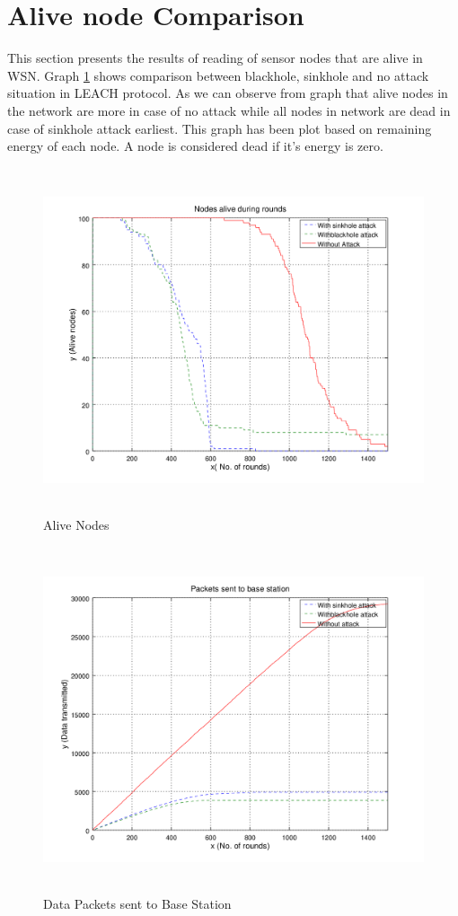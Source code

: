 \section{Alive node Comparison}
This section presents the results of reading of sensor nodes that are alive in WSN. Graph \ref{alive} shows comparison between blackhole, sinkhole and no attack situation in LEACH protocol. As we can observe from graph that alive nodes in the network are more in case of no attack while all nodes in network are dead in case of sinkhole attack earliest. This graph has been plot based on remaining energy of each node. A node is considered dead if it's energy is zero.
    \begin{figure}[tp]
     \centering
     \includegraphics[width=5.5in, height=4in] {Figures/PNG/alive.png}
     \caption{Alive Nodes}
     \label{alive}
    \end{figure}

    \begin{figure}[bp]
     \centering
     \includegraphics[width=5.5in, height=4in] {Figures/PNG/packets.png}
     \caption{Data Packets sent to Base Station}
     \label{packets}
    \end{figure}
